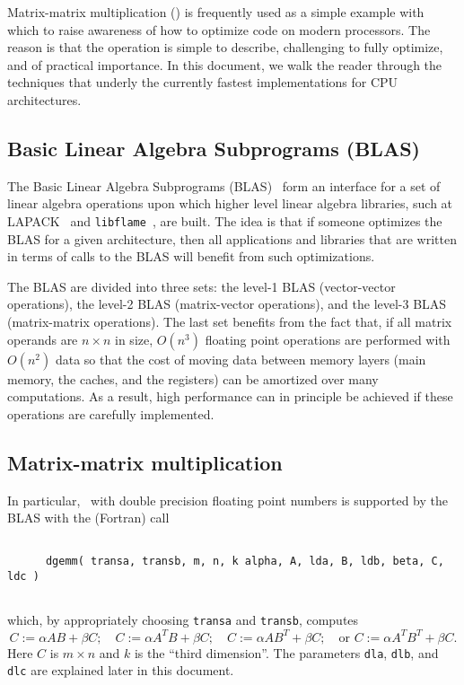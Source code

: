 Matrix-matrix multiplication (\Gemm) is frequently used as a simple example with which to raise awareness of how to optimize code on modern processors.  The reason is that the operation is simple to describe, challenging to fully optimize, and of practical importance.  In this document, we walk the reader through the techniques that underly the currently fastest implementations for CPU architectures.

\subsection{Basic Linear Algebra Subprograms (BLAS)}

The Basic Linear Algebra Subprograms (BLAS)~\cite{BLAS1,BLAS2,BLAS3,BLIS-Encycl} form an interface for a set of linear algebra operations upon which higher level linear algebra libraries, such at LAPACK~\cite{LAPACK3} and {\tt libflame}~\cite{libflame_ref}, are built.  The idea is that if someone optimizes the BLAS for a given architecture, then all applications and libraries that are written in terms of calls to the BLAS will benefit from such optimizations.  

The BLAS are divided into three sets: the level-1 BLAS (vector-vector operations), the level-2 BLAS (matrix-vector operations), and the level-3 BLAS (matrix-matrix operations).
The last set benefits from the fact that, if all matrix operands are $ n \times n$ in size, $ O( n^3 ) $ floating point operations are performed with $ O( n^2 ) $ data so that the cost of moving data between memory layers (main memory, the caches, and the registers) can be amortized over many computations.  As a result, high performance can in principle be achieved if these operations are carefully implemented.

\subsection{Matrix-matrix multiplication}

In particular, \Gemm\ with double precision floating point numbers is supported by the BLAS with the (Fortran) call
\begin{verbatim}

      dgemm( transa, transb, m, n, k alpha, A, lda, B, ldb, beta, C, ldc )
      
\end{verbatim}
which, by appropriately choosing {\tt transa} and {\tt transb}, 
computes 
\[
C := \alpha A B + \beta C; \quad
C := \alpha A^T B + \beta C; \quad
C := \alpha A B^T + \beta C; \quad \mbox{or }
C := \alpha A^T B^T + \beta C.
\]
Here $ C $ is $ m \times n $ and $ k $ is the ``third dimension''.  The parameters {\tt dla}, {\tt dlb}, and {\tt dlc} are explained later in this document.

